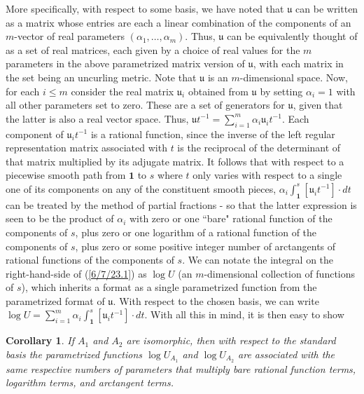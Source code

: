\documentclass{amsart}
\numberwithin{equation}{section}
\newtheorem{corollary}[theorem]{Corollary}
\theoremstyle{definition}
\numberwithin{theorem}{section}
\begin{document}
More specifically, with respect to some basis, we have noted that $\mathfrak{u}$ can be written as a matrix whose entries are each a linear combination of the components of an $m$-vector of real parameters $(\alpha_1, \dots, \alpha_m)$.   Thus, $\mathfrak{u}$ can be equivalently thought of as a set of real matrices, each given by a choice of real values for the $m$ parameters in the above parametrized matrix version of $\mathfrak{u}$, with each matrix in the set being an uncurling metric.   Note that $\mathfrak{u}$ is an $m$-dimensional space.    Now, for each $i\le m$ consider the real matrix  $\mathfrak{u}_i$ obtained from $\mathfrak{u}$ by setting $\alpha_i =1$ with all other parameters set to zero.  These are a set of generators for $\mathfrak{u}$, given that the latter is also a real vector space. Thus, $\mathfrak{u}t^{-1} = \sum_{i=1}^m \alpha_i \mathfrak{u}_i t^{-1}$.   Each component of $\mathfrak{u}_i t^{-1}$ is a rational function, since the inverse of the left regular representation matrix associated with $t$ is the reciprocal of the determinant of that matrix multiplied by its adjugate matrix.  It follows that  with respect to a piecewise smooth path from $\mathbf{1}$ to $s$ where $t$ only varies with respect to a single one of its components on any of the constituent smooth pieces, $\alpha_i \int_{\mathbf{1}}^s [\mathfrak{u}_i t^{-1}]\cdot dt$ can be treated by the method of partial fractions - so that the latter expression is seen to be the product of $\alpha_i$ with zero or one ``bare" rational function of the components of $s$, plus zero or one logarithm of a rational function of the components of $s$, plus zero or some positive integer number of arctangents of rational functions of the components of $s$.  We can notate the integral on the right-hand-side of (\ref{6/7/23.1}) as $\log  U$ (an $m$-dimensional collection of functions of $s$), which inherits a format as a single parametrized function from the parametrized format of $\mathfrak{u}$.  With respect to the chosen basis, we can write $\log  U =\sum_{i=1}^m \alpha_i \int_{\mathbf{1}}^s [\mathfrak{u}_i t^{-1}]\cdot dt$.  With all this in mind, it is then easy to show

\begin{corollary} \label{6/6/23.3} If $A_1$ and $A_2$ are isomorphic, then with respect to the standard basis the parametrized functions $\log U_{A_1}$ and $\log U_{A_2}$ are associated with the same respective numbers of parameters that multiply bare rational function terms, logarithm terms, and arctangent terms.
\end{corollary}
\end{document}
